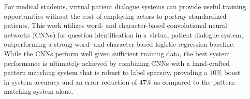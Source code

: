 For medical students, virtual patient dialogue systems can provide useful training opportunities without the cost of employing actors to portray standardized patients.              This work utilizes word- and character-based convolutional neural networks (CNNs) for question identification in a virtual patient dialogue system, outperforming a strong word- and character-based logistic regression baseline.  While the CNNs perform well given sufficient training data, the best system performance is ultimately achieved by combining CNNs with a hand-crafted pattern matching system that is robust to label sparsity, providing a 10\% boost in system accuracy and an error reduction of 47\% as compared to the pattern-matching system alone.
